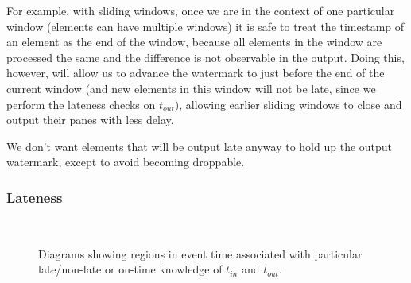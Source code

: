 For example, with sliding windows, once we are in the context of one particular window (elements can have multiple windows) it is safe to treat the timestamp of an element as the end of the window, because all elements in the window are processed the same and the difference is not observable in the output.
Doing this, however, will allow us to advance the watermark to just before the end of the current window (and new elements in this window will not be late, since we perform the lateness checks on $t_{\mathit{out}}$), allowing earlier sliding windows to close and output their panes with less delay.

We don't want elements that will be output late anyway to hold up the output watermark, except to avoid becoming droppable.


\subsubsection{Lateness}

\begin{figure}
	\centering
	\\
	\caption{Diagrams showing regions in event time associated with particular late/non-late or on-time knowledge of $t_{\mathit{in}}$ and $t_{\mathit{out}}$.}
	\label{fig:impl:lateness-semantics}
\end{figure}

